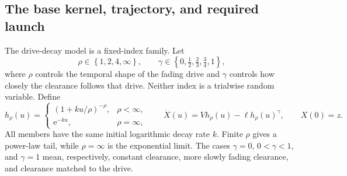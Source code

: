 \documentclass[12pt]{article}
\newcommand{\e}{\mathrm{e}}
\theoremstyle{remark}
\begin{document}
\subsection{The base kernel, trajectory, and required launch}
The drive-decay model is a fixed-index family. Let
\[
  \rho\in\left\{1,2,4,\infty\right\},\qquad
  \gamma\in\left\{0,\tfrac12,\tfrac23,\tfrac34,1\right\},
\]
where $\rho$ controls the temporal shape of the fading drive and $\gamma$ controls how closely the clearance follows that drive. Neither index is a trialwise random variable. Define
\begin{equation}
 h_\rho(u) =
 \begin{cases}
   (1+ku/\rho)^{-\rho}, & \rho<\infty,\\
   \e^{-ku}, & \rho=\infty,
 \end{cases}
 \qquad
 \dot X(u)=Vh_\rho(u)-\ell h_\rho(u)^\gamma,
 \qquad X(0)=z.
 \label{eq:bawd-generator}
\end{equation}
All members have the same initial logarithmic decay rate $k$. Finite $\rho$ gives a power-law tail, while $\rho=\infty$ is the exponential limit. The cases $\gamma=0$, $0<\gamma<1$, and $\gamma=1$ mean, respectively, constant clearance, more slowly fading clearance, and clearance matched to the drive.
\end{document}
